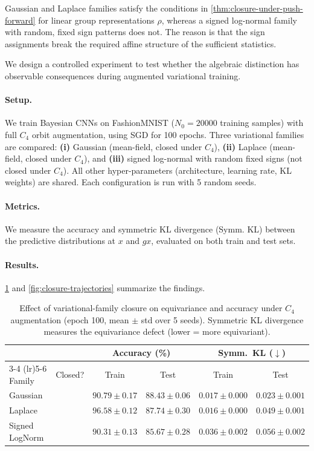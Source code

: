 \documentclass{article}
\newcommand{\cmark}{\ding{51}}
\newcommand{\xmark}{\ding{55}}
\begin{document}
Gaussian and Laplace families satisfy the conditions in \cref{thm:closure-under-push-forward} for linear group representations $\rho$, whereas a signed log-normal family with random, fixed sign patterns does not. The reason is that the sign assignments break the required affine structure of the sufficient statistics.

We design a controlled experiment to test whether the algebraic distinction has observable consequences during augmented variational training.

\paragraph{Setup.} We train Bayesian CNNs on FashionMNIST ($N_{0} = 20000$ training samples) with full $C_{4}$ orbit augmentation, using SGD for 100 epochs. Three variational families are compared: \textbf{(i)} Gaussian (mean-field, closed under $C_{4}$), \textbf{(ii)} Laplace (mean-field, closed under $C_{4}$), and \textbf{(iii)} signed log-normal with random fixed signs (not closed under $C_{4}$). All other hyper-parameters (architecture, learning rate, KL weights) are shared. Each configuration is run with 5 random seeds.

\paragraph{Metrics.} We measure the accuracy and symmetric KL divergence (Symm. KL) between the predictive distributions at $x$ and $gx$, evaluated on both train and test sets.

\paragraph{Results.} \cref{tab:closure-results} and \cref{fig:closure-trajectories} summarize the findings.

\begin{table}[h]
\centering
\small
\begin{tabular}{@{}l c c c c c@{}}
\toprule
 & & \multicolumn{2}{c}{Accuracy (\%)} & \multicolumn{2}{c}{Symm.\ KL ($\downarrow$)} \\
\cmidrule(lr){3-4} \cmidrule(lr){5-6}
Family & Closed? & Train & Test & Train & Test \\
\midrule
Gaussian       & \cmark & $90.79 \pm 0.17$ & $\mathbf{88.43 \pm 0.06}$ & $0.017 \pm 0.000$ & $\mathbf{0.023 \pm 0.001}$ \\
Laplace        & \cmark & $96.58 \pm 0.12$ & $87.74 \pm 0.30$ & $\mathbf{0.016 \pm 0.000}$ & $0.049 \pm 0.001$ \\
Signed LogNorm & \xmark & $90.31 \pm 0.13$ & $85.67 \pm 0.28$ & $0.036 \pm 0.002$ & $0.056 \pm 0.002$ \\
\bottomrule
\end{tabular}
\caption{Effect of variational-family closure on equivariance and accuracy under $C_4$ augmentation (epoch 100, mean $\pm$ std over 5 seeds). Symmetric KL divergence measures the equivariance defect (lower = more equivariant).}
\label{tab:closure-results}
\end{table}
\end{document}
